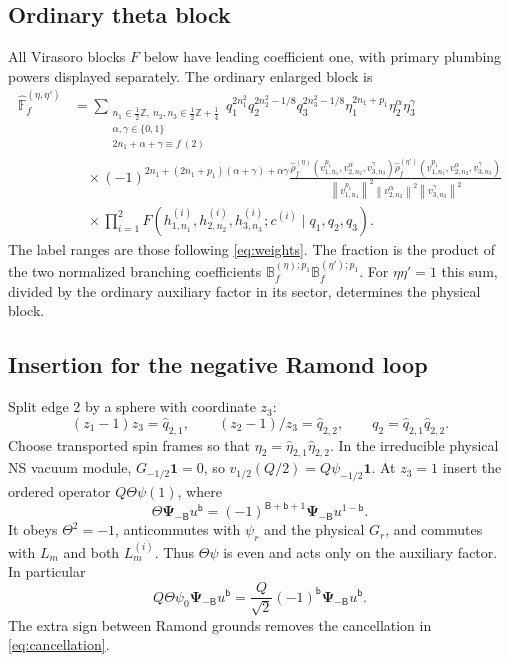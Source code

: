 \documentclass[11pt]{article}
\newcommand{\hFF}{\widehat{\mathbb F}}
\newcommand{\norm}[1]{\left\|#1\right\|^2}
\numberwithin{equation}{section}
\begin{document}
\subsection{Ordinary theta block}
All Virasoro blocks $F$ below have leading coefficient one, with primary
plumbing powers displayed separately. The ordinary enlarged block is
\begin{align}
 \hFF_f^{(\eta,\eta')}
 &=\sum_{\substack{n_1\in\frac12\mathbb Z,\ n_2,n_3\in\frac12\mathbb Z+\frac14\\
                         \alpha,\gamma\in\{0,1\}\\
                         2n_1+\alpha+\gamma\equiv f\ (2)}}
 q_1^{2n_1^2}q_2^{2n_2^2-1/8}q_3^{2n_3^2-1/8}
 \eta_1^{2n_1+p_1}\eta_2^\alpha\eta_3^\gamma\nonumber\\
 &\quad\times(-1)^{2n_1+(2n_1+p_1)(\alpha+\gamma)+\alpha\gamma}
 \frac{\hat\rho_f^{(\eta)}(v_{1,n_1}^{p_1},v_{2,n_2}^\alpha,v_{3,n_3}^\gamma)
       \hat\rho_f^{(\eta')}(v_{1,n_1}^{p_1},v_{2,n_2}^\alpha,v_{3,n_3}^\gamma)}
 {\norm{v_{1,n_1}^{p_1}}\norm{v_{2,n_2}^\alpha}\norm{v_{3,n_3}^\gamma}}
 \nonumber\\
 &\quad\times\prod_{i=1}^2
 F(h_{1,n_1}^{(i)},h_{2,n_2}^{(i)},h_{3,n_3}^{(i)};c^{(i)}\mid q_1,q_2,q_3).
 \label{eq:ordinary-sum}
\end{align}
The label ranges are those following \eqref{eq:weights}.
The fraction is the product of the two normalized branching coefficients
$\mathbb B_f^{(\eta);p_1}\mathbb B_f^{(\eta');p_1}$.
For $\eta\eta'=1$ this sum, divided by the ordinary auxiliary factor in
its sector, determines the physical block.

\subsection{Insertion for the negative Ramond loop}
Split edge 2 by a sphere with coordinate $z_3$:
\begin{equation}
 (z_1-1)z_3=\hat q_{2,1},\qquad
 (z_2-1)/z_3=\hat q_{2,2},\qquad
 q_2=\hat q_{2,1}\hat q_{2,2}.
 \label{eq:plumbing}
\end{equation}
Choose transported spin frames so that
$\eta_2=\hat\eta_{2,1}\hat\eta_{2,2}$.
In the irreducible physical NS vacuum module,
$G_{-1/2}\mathbf1=0$, so $v_{1/2}(Q/2)=Q\psi_{-1/2}\mathbf1$.
At $z_3=1$ insert the ordered operator $Q\Theta\psi(1)$, where
\begin{equation}
 \Theta\boldsymbol\Psi_{-\mathsf B}u^{\mathsf b}
 =(-1)^{\mathsf B+\mathsf b+1}
    \boldsymbol\Psi_{-\mathsf B}u^{1-\mathsf b}.
 \label{eq:Theta}
\end{equation}
It obeys $\Theta^2=-1$, anticommutes with $\psi_r$ and the physical $G_r$,
and commutes with $L_m$ and both $L_m^{(i)}$.
Thus $\Theta\psi$ is even and acts only on the auxiliary factor.
In particular
\begin{equation}
 Q\Theta\psi_0\boldsymbol\Psi_{-\mathsf B}u^{\mathsf b}
 =\frac Q{\sqrt2}(-1)^{\mathsf b}
     \boldsymbol\Psi_{-\mathsf B}u^{\mathsf b}.
 \label{eq:diagonal-insertion}
\end{equation}
The extra sign between Ramond grounds removes the cancellation in
\eqref{eq:cancellation}.
\end{document}
